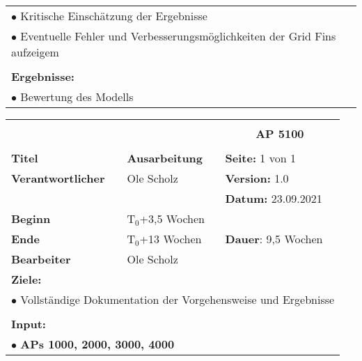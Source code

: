 \begin{table}[!h]
\begin{center}
\begin{tabular}{|p{35mm}||p{55mm}|p{50mm}||p{40mm}|}
			\multicolumn{4}{|p{150mm}|}{$\bullet$ Kritische Einschätzung der Ergebnisse}\\
			\multicolumn{4}{|p{150mm}|}{$\bullet$ Eventuelle Fehler und Verbesserungsmöglichkeiten der Grid Fins aufzeigem}\\
			\multicolumn{4}{|p{150mm}|}{}\\
			\multicolumn{4}{|p{150mm}|}{\textbf{Ergebnisse:}}\\
			\multicolumn{4}{|p{150mm}|}{$\bullet$ Bewertung des Modells}\\
			\hline
		\end{tabular}
	\end{center}
\end{table}

\clearpage
\begin{table}[!h]
	\begin{center}
		\begin{tabular}{|p{35mm}||p{55mm}|p{50mm}||p{40mm}|}
			\hline
			\multicolumn{3}{|l||}{\textbf{}} & \multicolumn{1}{c|}{}\\
			\multicolumn{3}{|l||}{\textbf{}} & \multicolumn{1}{c|}{\textbf{AP 5100}}\\
			\multicolumn{3}{|l||}{\textbf{}} & \multicolumn{1}{c|}{}\\
			\hline\hline
			\textbf{Titel} & \multicolumn{2}{p{7cm}||}{\textbf{Ausarbeitung}} 
			& \textbf{Seite:} 1 von 1\\
			\hline
			\textbf{Verantwortlicher} & \multicolumn{2}{l||}{Ole Scholz} & \textbf{Version:} 1.0\\
			\hline
			\multicolumn{3}{|l||}{} & \textbf{Datum:} 23.09.2021\\
			\hline\hline
			\textbf{Beginn} & \multicolumn{2}{l||}{T$_0$+3,5 Wochen} & \\
			\hline
			\textbf{Ende} & \multicolumn{2}{l||}{T$_0$+13 Wochen} & \textbf{Dauer}: 9,5 Wochen\\
			\hline\hline
			\textbf{Bearbeiter} & \multicolumn{3}{l|}{Ole Scholz}\\
			\hline\hline
			\multicolumn{4}{|p{150mm}|}{\textbf{Ziele:}}\\
			\multicolumn{4}{|p{150mm}|}{$\bullet$ Vollständige Dokumentation der Vorgehensweise und Ergebnisse}\\
			\multicolumn{4}{|p{150mm}|}{}\\
			\multicolumn{4}{|p{150mm}|}{\textbf{Input:}}\\
			\multicolumn{4}{|p{150mm}|}{$\bullet$ \textbf{APs 1000, 2000, 3000, 4000}}\\

\end{tabular}
\end{center}
\end{table}
